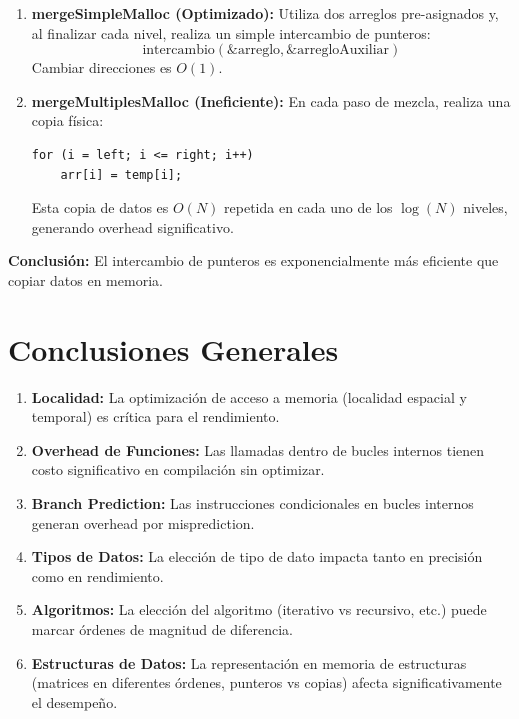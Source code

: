\documentclass[11pt,a4paper]{article}
\begin{document}
\begin{enumerate}
\item \textbf{mergeSimpleMalloc (Optimizado):}
Utiliza dos arreglos pre-asignados y, al finalizar cada nivel, realiza un simple intercambio de punteros:
$$\text{intercambio}(\&\text{arreglo}, \&\text{arregloAuxiliar})$$
Cambiar direcciones es $O(1)$.

\item \textbf{mergeMultiplesMalloc (Ineficiente):}
En cada paso de mezcla, realiza una copia física:
\begin{lstlisting}
for (i = left; i <= right; i++)
    arr[i] = temp[i];
\end{lstlisting}
Esta copia de datos es $O(N)$ repetida en cada uno de los $\log(N)$ niveles, generando overhead significativo.
\end{enumerate}

\textbf{Conclusión:} El intercambio de punteros es exponencialmente más eficiente que copiar datos en memoria.

\section*{Conclusiones Generales}

\begin{enumerate}
\item \textbf{Localidad:} La optimización de acceso a memoria (localidad espacial y temporal) es crítica para el rendimiento.

\item \textbf{Overhead de Funciones:} Las llamadas dentro de bucles internos tienen costo significativo en compilación sin optimizar.

\item \textbf{Branch Prediction:} Las instrucciones condicionales en bucles internos generan overhead por misprediction.

\item \textbf{Tipos de Datos:} La elección de tipo de dato impacta tanto en precisión como en rendimiento.

\item \textbf{Algoritmos:} La elección del algoritmo (iterativo vs recursivo, etc.) puede marcar órdenes de magnitud de diferencia.

\item \textbf{Estructuras de Datos:} La representación en memoria de estructuras (matrices en diferentes órdenes, punteros vs copias) afecta significativamente el desempeño.
\end{enumerate}
\end{document}
